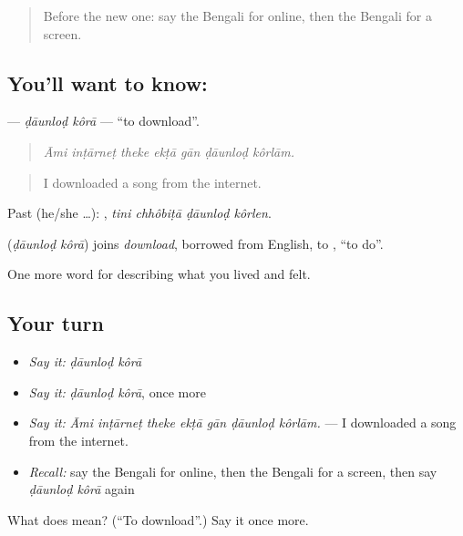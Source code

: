 \label{lesson:BN-C503-daunlod-kora}



\begin{quote}
Before the new one: say the Bengali for online, then the Bengali for a screen.
\end{quote}

\subsection*{You'll want to know:  }
\textbf{ } — \emph{ḍāunloḍ kôrā} — \textquotedblleft{}to download\textquotedblright{}.

\begin{quote}
      
\end{quote}

\begin{quote}
\emph{Āmi inṭārneṭ theke ekṭā gān ḍāunloḍ kôrlām.}
\end{quote}

\begin{quote}
I downloaded a song from the internet.
\end{quote}

Past (he/she …):    , \emph{tini chhôbiṭā ḍāunloḍ kôrlen}.

\begin{cousinweb}
\textbf{ } (\emph{ḍāunloḍ kôrā}) joins \emph{download}, borrowed from English, to , \textquotedblleft{}to do\textquotedblright{}.
\end{cousinweb}

\begin{grammarlens}[title={What you've built}]
One more word for describing what you lived and felt.
\end{grammarlens}

\subsection*{Your turn}
\begin{itemize}
\raggedright
  \item \emph{Say it:} \emph{ḍāunloḍ kôrā}
  \item \emph{Say it:} \emph{ḍāunloḍ kôrā}, once more
  \item \emph{Say it:} \emph{Āmi inṭārneṭ theke ekṭā gān ḍāunloḍ kôrlām.} — I downloaded a song from the internet.
  \item \emph{Recall:} say the Bengali for online, then the Bengali for a screen, then say \emph{ḍāunloḍ kôrā} again
\end{itemize}

\begin{tcolorbox}[breakable,colback=teal!4,colframe=teal!35!black,title={Before you move on}]
What does   mean? (\textquotedblleft{}To download\textquotedblright{}.) Say it once more.
\end{tcolorbox}
